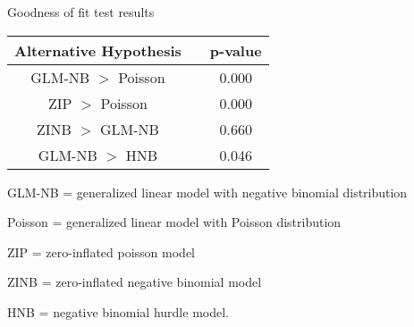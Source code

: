 \documentclass{standalone}
\begin{document}
\begin{threeparttable}
\caption{Goodness of fit test results}
\begin{tabular}{@{}ccc@{}}
  \toprule
Alternative Hypothesis & \hspace{4em} & p-value \\ 
  \midrule
GLM-NB $>$ Poisson && 0.000 \\ 
  ZIP $>$ Poisson & &0.000 \\ 
  ZINB $>$ GLM-NB && 0.660 \\ 
  GLM-NB $>$ HNB & &0.046 \\ 
   \bottomrule
\end{tabular}
\begin{tablenotes}
\small
\item GLM-NB = generalized linear model with negative binomial distribution
\item Poisson = generalized linear model with Poisson distribution 
\item ZIP = zero-inflated poisson model 
\item ZINB = zero-inflated negative binomial model 
\item HNB = negative binomial hurdle model. 
\end{tablenotes}
\end{threeparttable}
\end{document}
